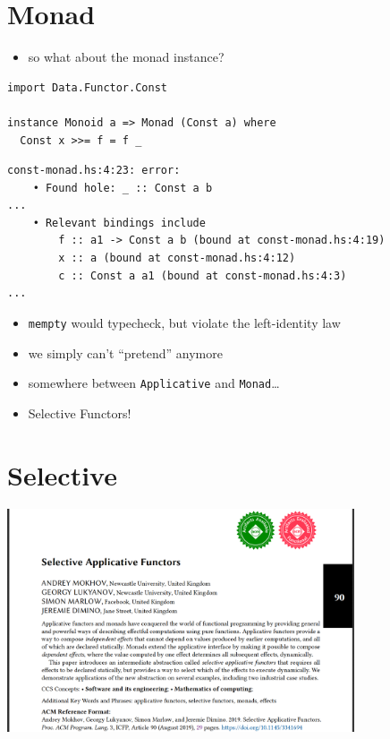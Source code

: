 \documentclass[aspectratio=169]{beamer}
\begin{document}
\section{Monad}

\begin{frame}[fragile]
  \begin{itemize}
  \item so what about the monad instance?
  \end{itemize}

  \begin{verbatim}
import Data.Functor.Const

instance Monoid a => Monad (Const a) where
  Const x >>= f = f _
  \end{verbatim}
  \begin{verbatim}
const-monad.hs:4:23: error:
    • Found hole: _ :: Const a b
...
    • Relevant bindings include
        f :: a1 -> Const a b (bound at const-monad.hs:4:19)
        x :: a (bound at const-monad.hs:4:12)
        c :: Const a a1 (bound at const-monad.hs:4:3)
...
  \end{verbatim}
  \begin{itemize}
  \item \texttt{mempty} would typecheck, but violate the left-identity law
  \item we simply can't ``pretend'' anymore
  \end{itemize}
\end{frame}

\begin{frame}[fragile]
  \begin{itemize}
  \item somewhere between \texttt{Applicative} and \texttt{Monad}\ldots
  \item Selective Functors!
  \end{itemize}
\end{frame}

\section{Selective}

\begin{frame}[fragile]
  \begin{center}
    \includegraphics[width=0.77\textwidth]{static-images/selective-applicative-functors-paper.jpg}
    \vfill
  \end{center}
\end{frame}
\end{document}
